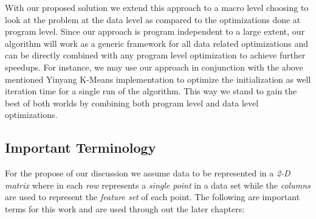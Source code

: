 \documentclass{vldb}
\begin{document}
With our proposed solution we extend this approach to a macro level choosing to look at the problem at the data level as compared to the optimizations done at program level. Since our approach is program independent to a large extent, our algorithm will work as a generic framework for all data related optimizations and can be directly combined with any program level optimization to achieve further speedups. For instance, we may use our approach in conjunction with the above mentioned Yinyang K-Means implementation to optimize the initialization as well iteration time for a single run of the algorithm. This way we stand to gain the best of both worlds by combining both program level and data level optimizations.


\subsection{Important Terminology}
For the propose of our discussion we assume data to be represented in a \textit{2-D matrix} where in each \textit{row} represents a \textit{single point} in a data set while the \textit{columns} are used to represent the \textit{feature set} of each point.
The following are important terms for this work and are used through out the later chapters:
\end{document}
